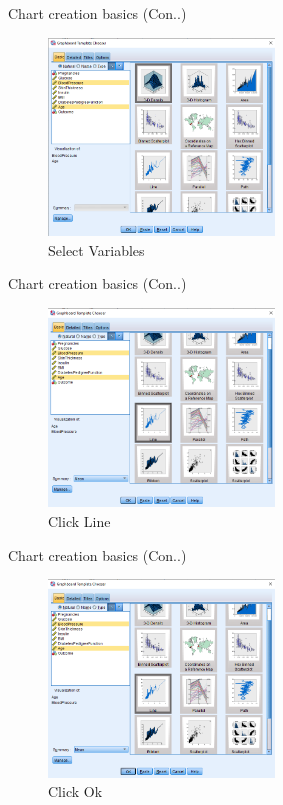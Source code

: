 \begin{frame}[t]{Chart creation basics (Con..)}
	\begin{figure}
		\centering
		\includegraphics[width=6cm]{img/charts_2}
		\caption{Select Variables}
	\end{figure}
\end{frame}
\begin{frame}[t]{Chart creation basics (Con..)}
	\begin{figure}
		\centering
		\includegraphics[width=6cm]{img/charts_3}
		\caption{Click Line}
	\end{figure}
\end{frame}
\begin{frame}[t]{Chart creation basics (Con..)}
	\begin{figure}
		\centering
		\includegraphics[width=6cm]{img/charts_4}
		\caption{Click Ok}
	\end{figure}
\end{frame}
